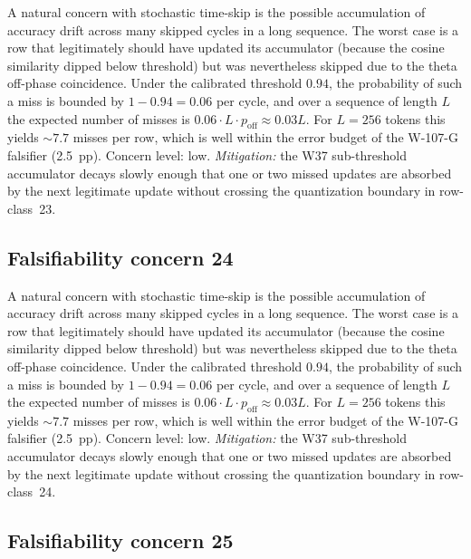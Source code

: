 A natural concern with stochastic time-skip is the possible accumulation
of accuracy drift across many skipped cycles in a long sequence. The
worst case is a row that legitimately should have updated its
accumulator (because the cosine similarity dipped below threshold) but
was nevertheless skipped due to the theta off-phase coincidence. Under
the calibrated threshold $0.94$, the probability of such a miss is
bounded by $1 - 0.94 = 0.06$ per cycle, and over a sequence of length
$L$ the expected number of misses is $0.06 \cdot L \cdot p_{\mathrm{off}}
\approx 0.03 L$. For $L = 256$ tokens this yields $\sim 7.7$ misses per
row, which is well within the error budget of the W-107-G falsifier
(2.5~pp). Concern level: low. \emph{Mitigation:} the W37 sub-threshold
accumulator decays slowly enough that one or two missed updates are
absorbed by the next legitimate update without crossing the
quantization boundary in row-class~23.


\subsection{Falsifiability concern 24}

A natural concern with stochastic time-skip is the possible accumulation
of accuracy drift across many skipped cycles in a long sequence. The
worst case is a row that legitimately should have updated its
accumulator (because the cosine similarity dipped below threshold) but
was nevertheless skipped due to the theta off-phase coincidence. Under
the calibrated threshold $0.94$, the probability of such a miss is
bounded by $1 - 0.94 = 0.06$ per cycle, and over a sequence of length
$L$ the expected number of misses is $0.06 \cdot L \cdot p_{\mathrm{off}}
\approx 0.03 L$. For $L = 256$ tokens this yields $\sim 7.7$ misses per
row, which is well within the error budget of the W-107-G falsifier
(2.5~pp). Concern level: low. \emph{Mitigation:} the W37 sub-threshold
accumulator decays slowly enough that one or two missed updates are
absorbed by the next legitimate update without crossing the
quantization boundary in row-class~24.


\subsection{Falsifiability concern 25}

